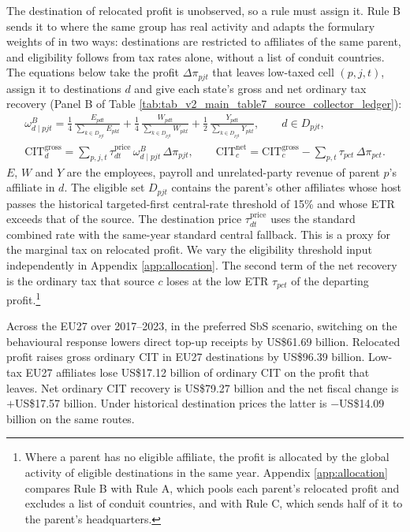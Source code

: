 \documentclass[11pt,a4paper]{article}
\newcommand{\usd}{US\$}
\begin{document}
The destination of relocated profit is unobserved, so a rule must assign it. Rule B sends it to where the same group has real activity and adapts the formulary weights of \citet{garcia-bernardo2024} in two ways: destinations are restricted to affiliates of the same parent, and eligibility follows from tax rates alone, without a list of conduit countries. The equations below take the profit $\Delta\pi_{pjt}$ that leaves low-taxed cell $(p,j,t)$, assign it to destinations $d$ and give each state's gross and net ordinary tax recovery (Panel B of Table \ref{tab:tab_v2_main_table7_source_collector_ledger}):
\begin{gather}
\omega^{B}_{d\mid pjt} = \frac{1}{4}\,\frac{E_{pdt}}{\sum_{k\in D_{pjt}}E_{pkt}} + \frac{1}{4}\,\frac{W_{pdt}}{\sum_{k\in D_{pjt}}W_{pkt}} + \frac{1}{2}\,\frac{Y_{pdt}}{\sum_{k\in D_{pjt}}Y_{pkt}},\qquad d\in D_{pjt}, \label{eq:ruleb}\\
\mathrm{CIT}^{\mathrm{gross}}_{d} = \sum_{p,j,t}\tau^{\mathrm{price}}_{dt}\,\omega^{B}_{d\mid pjt}\,\Delta\pi_{pjt}, \qquad
\mathrm{CIT}^{\mathrm{net}}_{c} = \mathrm{CIT}^{\mathrm{gross}}_{c} - \sum_{p,t}\tau_{pct}\,\Delta\pi_{pct}. \label{eq:citrecovery}
\end{gather}
$E$, $W$ and $Y$ are the employees, payroll and unrelated-party revenue of parent $p$'s affiliate in $d$. The eligible set $D_{pjt}$ contains the parent's other affiliates whose host passes the historical targeted-first central-rate threshold of 15\% and whose ETR exceeds that of the source. The destination price $\tau^{\mathrm{price}}_{dt}$ uses the standard combined rate with the same-year standard central fallback. This is a proxy for the marginal tax on relocated profit. We vary the eligibility threshold input independently in Appendix \ref{app:allocation}. The second term of the net recovery is the ordinary tax that source $c$ loses at the low ETR $\tau_{pct}$ of the departing profit.\footnote{Where a parent has no eligible affiliate, the profit is allocated by the global activity of eligible destinations in the same year. Appendix \ref{app:allocation} compares Rule B with Rule A, which pools each parent's relocated profit and excludes a list of conduit countries, and with Rule C, which sends half of it to the parent's headquarters.}

Across the EU27 over 2017–2023, in the preferred SbS scenario, switching on the behavioural response lowers direct top-up receipts by \usd61.69 billion. Relocated profit raises gross ordinary CIT in EU27 destinations by \usd96.39 billion. Low-tax EU27 affiliates lose \usd17.12 billion of ordinary CIT on the profit that leaves. Net ordinary CIT recovery is \usd79.27 billion and the net fiscal change is $+$\usd17.57 billion. Under historical destination prices the latter is $-$\usd14.09 billion on the same routes.
\end{document}
